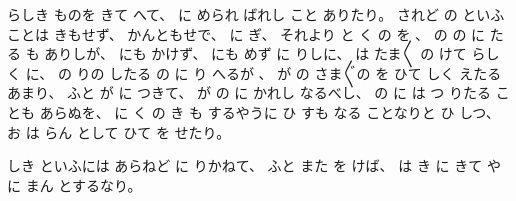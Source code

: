 らしき
ものを
きて
へて、
%
に
められ
ばれし
こと
ありたり。
%
されど
の
といふことは
きもせず、
%
かんともせで、
%
に
ぎ、
%
それより
と
く
の
を
%
、
%
の
の
に
たる
も
ありしが、
%
にも
かけず、
%
にも
めず
に
りしに、
%
は
たま〳〵
の
けて
らしく
に、
%
の
りの
したる
の
に
り
へるが
、
%
が
の
さま〴〵の
を
ひて
しく
えたる
あまり、
%
ふと
が
に
つきて、
%
が
の
に
かれし
なるべし、
%
の
に
は
つ
りたる
ことも
あらぬを、
%
に
く
の
き
も
するやうに
ひ
すも
なる
ことなりと
ひ
しつ、
%
お
は
らん
として
ひて
を
せたり。

%
しき
といふには
あらねど
に
りかねて、
%
ふと
また
を
けば、
%
は
き
に
きて
や
に
まん
とするなり。

